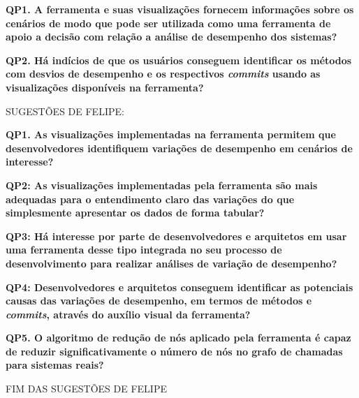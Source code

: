 \textbf{QP1. A ferramenta e suas visualizações fornecem informações sobre os cenários de modo que pode ser utilizada como uma ferramenta de apoio a decisão com relação a análise de desempenho dos sistemas?}

\textbf{QP2. Há indícios de que os usuários conseguem identificar os métodos com desvios de desempenho e os respectivos \textit{commits} usando as visualizações disponíveis na ferramenta?}

{\color{red}SUGESTÕES DE FELIPE:}

\textbf{QP1. As visualizações implementadas na ferramenta permitem que desenvolvedores identifiquem variações de desempenho em cenários de interesse?}

\textbf{QP2: As visualizações implementadas pela ferramenta são mais adequadas para o entendimento claro das variações do que simplesmente apresentar os dados de forma tabular?}

\textbf{QP3: Há interesse por parte de desenvolvedores e arquitetos em usar uma ferramenta desse tipo integrada no seu processo de desenvolvimento para realizar análises de variação de desempenho?}

\textbf{QP4: Desenvolvedores e arquitetos conseguem identificar as potenciais causas das variações de desempenho, em termos de métodos e \textit{commits}, através do auxílio visual da ferramenta?}

\textbf{QP5. O algoritmo de redução de nós aplicado pela ferramenta é capaz de reduzir significativamente o número de nós no grafo de chamadas para sistemas reais?}

{\color{red}FIM DAS SUGESTÕES DE FELIPE}



